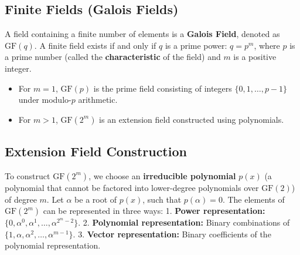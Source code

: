 \documentclass[12pt,a4paper]{article}
\begin{document}
\subsection{Finite Fields (Galois Fields)}
A field containing a finite number of elements is a \textbf{Galois Field}, denoted as $\text{GF}(q)$. A finite field exists if and only if $q$ is a prime power: $q = p^m$, where $p$ is a prime number (called the \textbf{characteristic} of the field) and $m$ is a positive integer.
\begin{itemize}[leftmargin=*, itemsep=2pt]
  \item For $m=1$, $\text{GF}(p)$ is the prime field consisting of integers $\{0, 1, \dots, p-1\}$ under modulo-$p$ arithmetic.
  \item For $m > 1$, $\text{GF}(2^m)$ is an extension field constructed using polynomials.
\end{itemize}

\subsection{Extension Field Construction}
To construct $\text{GF}(2^m)$, we choose an \textbf{irreducible polynomial} $p(x)$ (a polynomial that cannot be factored into lower-degree polynomials over $\text{GF}(2)$) of degree $m$. Let $\alpha$ be a root of $p(x)$, such that $p(\alpha) = 0$.
The elements of $\text{GF}(2^m)$ can be represented in three ways:
1. \textbf{Power representation:} $\{0, \alpha^0, \alpha^1, \dots, \alpha^{2^m-2}\}$.
2. \textbf{Polynomial representation:} Binary combinations of $\{1, \alpha, \alpha^2, \dots, \alpha^{m-1}\}$.
3. \textbf{Vector representation:} Binary coefficients of the polynomial representation.
\end{document}
